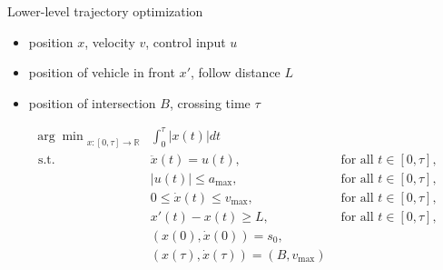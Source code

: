\documentclass[bigger]{beamer}
\begin{document}
\begin{frame}[label={sec:orgb53b409}]{Lower-level trajectory optimization}
\begin{itemize}
\item position \(x\), velocity \(v\), control input \(u\)
\item position of vehicle in front \(x'\), follow distance \(L\)
\item position of intersection \(B\), crossing time \(\tau\)
\end{itemize}

\begin{align*}
  {\arg\min}_{x: [0, \tau] \rightarrow \mathbb{R}} & \int_{0}^{\tau} |x(t)| dt \\
  \text{ s.t. } & \ddot{x}(t) = u(t) , &  \text{ for all } t \in [0, \tau] , \\
  & |u(t)| \leq a_{\max} , &  \text{ for all } t \in [0, \tau] , \\
  & 0 \leq \dot{x}(t) \leq v_{\max} , &  \text{ for all } t \in [0, \tau] , \\
  & x'(t) - x(t) \geq L , &  \text{ for all } t \in [0, \tau] , \\
  & (x(0), \dot{x}(0)) = s_{0} , \\
  & (x(\tau), \dot{x}(\tau)) = (B, v_{\max})
\end{align*}
\end{frame}
\end{document}

